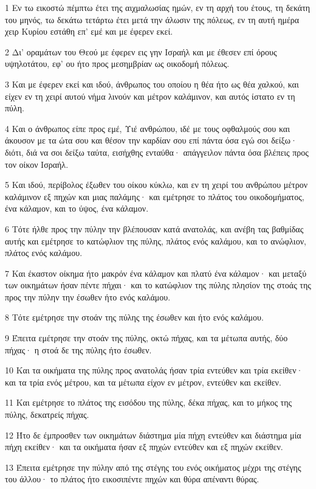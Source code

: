 \par 1 Εν τω εικοστώ πέμπτω έτει της αιχμαλωσίας ημών, εν τη αρχή του έτους, τη δεκάτη του μηνός, τω δεκάτω τετάρτω έτει μετά την άλωσιν της πόλεως, εν τη αυτή ημέρα χειρ Κυρίου εστάθη επ' εμέ και με έφερεν εκεί.
\par 2 Δι' οραμάτων του Θεού με έφερεν εις γην Ισραήλ και με έθεσεν επί όρους υψηλοτάτου, εφ' ου ήτο προς μεσημβρίαν ως οικοδομή πόλεως.
\par 3 Και με έφερεν εκεί και ιδού, άνθρωπος του οποίου η θέα ήτο ως θέα χαλκού, και είχεν εν τη χειρί αυτού νήμα λινούν και μέτρον καλάμινον, και αυτός ίστατο εν τη πύλη.
\par 4 Και ο άνθρωπος είπε προς εμέ, Υιέ ανθρώπου, ιδέ με τους οφθαλμούς σου και άκουσον με τα ώτα σου και θέσον την καρδίαν σου επί πάντα όσα εγώ σοι δείξω· διότι, διά να σοι δείξω ταύτα, εισήχθης ενταύθα· απάγγειλον πάντα όσα βλέπεις προς τον οίκον Ισραήλ.
\par 5 Και ιδού, περίβολος έξωθεν του οίκου κύκλω, και εν τη χειρί του ανθρώπου μέτρον καλάμινον εξ πηχών και μιας παλάμης· και εμέτρησε το πλάτος του οικοδομήματος, ένα κάλαμον, και το ύψος, ένα κάλαμον.
\par 6 Τότε ήλθε προς την πύλην την βλέπουσαν κατά ανατολάς, και ανέβη τας βαθμίδας αυτής και εμέτρησε το κατώφλιον της πύλης, πλάτος ενός καλάμου, και το ανώφλιον, πλάτος ενός καλάμου.
\par 7 Και έκαστον οίκημα ήτο μακρόν ένα κάλαμον και πλατύ ένα κάλαμον· και μεταξύ των οικημάτων ήσαν πέντε πήχαι· και το κατώφλιον της πύλης πλησίον της στοάς της προς την πύλην την έσωθεν ήτο ενός καλάμου.
\par 8 Τότε εμέτρησε την στοάν της πύλης της έσωθεν και ήτο ενός καλάμου.
\par 9 Έπειτα εμέτρησε την στοάν της πύλης, οκτώ πήχας, και τα μέτωπα αυτής, δύο πήχας· η στοά δε της πύλης ήτο έσωθεν.
\par 10 Και τα οικήματα της πύλης προς ανατολάς ήσαν τρία εντεύθεν και τρία εκείθεν· και τα τρία ενός μέτρου, και τα μέτωπα είχον εν μέτρον, εντεύθεν και εκείθεν.
\par 11 Και εμέτρησε το πλάτος της εισόδου της πύλης, δέκα πήχας, και το μήκος της πύλης, δεκατρείς πήχας.
\par 12 Ήτο δε έμπροσθεν των οικημάτων διάστημα μία πήχη εντεύθεν και διάστημα μία πήχη εκείθεν· και τα οικήματα ήσαν εξ πηχών εντεύθεν και εξ πηχών εκείθεν.
\par 13 Έπειτα εμέτρησε την πύλην από της στέγης του ενός οικήματος μέχρι της στέγης του άλλου· το πλάτος ήτο εικοσιπέντε πηχών και θύρα απέναντι θύρας.
